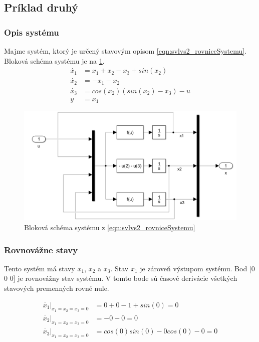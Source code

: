 \documentclass[../main.tex]{subfiles}
\begin{document}
	\subsection{Príklad druhý}
    \subsubsection{Opis systému}
	Majme systém, ktorý je určený stavovým opisom \cref{eqn:svlvs2_rovniceSystemu}. Bloková schéma systému je na \cref{fig:svlvs2_obrazokModelSystemu}.
	\begin{equation}
		\begin{aligned}
		\dot{x_1} &= x_1 + x_2 - x_3 + sin(x_2) 			\\
		\dot{x_2} &= - x_1 - x_2 						\\
		\dot{x_3} &= cos(x_2) (sin(x_2) - x_3) - u 	\\
		y &= x_1
		\end{aligned}
		\label{eqn:svlvs2_rovniceSystemu}
	\end{equation}

	\begin{figure}[h!]
		\centering
		\includegraphics[width=0.8\linewidth]{ModelSystemu}
		\caption{Bloková schéma systému z \cref{eqn:svlvs2_rovniceSystemu}}
		\label{fig:svlvs2_obrazokModelSystemu}
	\end{figure}

    \subsubsection{Rovnovážne stavy}
Tento systém má stavy $x_1$, $x_2$ a $x_3$. Stav $x_1$ je zároveň výstupom systému.
Bod [0 0 0] je rovnovážny stav systému. V tomto bode sú časové derivácie všetkých stavových premenných rovné nule.

	\begin{equation}
		\begin{aligned}
		\dot{x_1}|_{x_1 = x_2 = x_3 = 0} &= 0 + 0 - 1 + sin(0) = 0 					\\
		\dot{x_2}|_{x_1 = x_2 = x_3 = 0} &= -0 - 0 = 0 							\\
		\dot{x_3}|_{x_1 = x_2 = x_3 = 0} &= cos(0)sin(0) - 0cos(0) - 0 = 0 			\\
		\end{aligned}
		\label{eqn:svlvs2_rovniceRovnovaznyStav}
	\end{equation}
\end{document}
